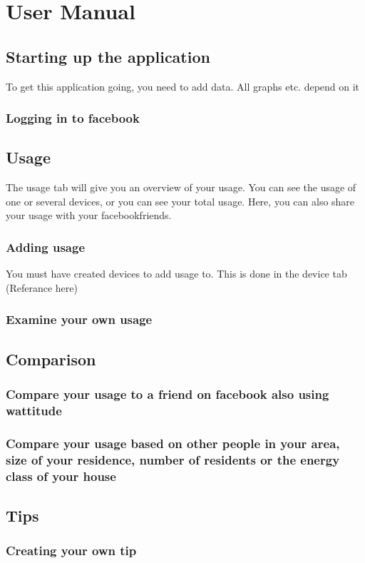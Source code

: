 \chapter{User Manual}

\section{Starting up the application}
To get this application going, you need to add data. All graphs etc. depend on it
\subsection{Logging in to facebook}

\section{Usage}
The usage tab will give you an overview of your usage. You can see the usage of one or several devices, or you can see your total usage. Here, you can also share your usage with your facebookfriends.
\subsection{Adding usage}
You must have created devices to add usage to. This is done in the device tab (Referance here)
\subsection{Examine your own usage}

\section{Comparison}
\subsection{Compare your usage to a friend on facebook also using wattitude}
\subsection{Compare your usage based on other people in your area, size of your residence, number of residents or the energy class of your house}

\section{Tips}
\subsection{Creating your own tip}
